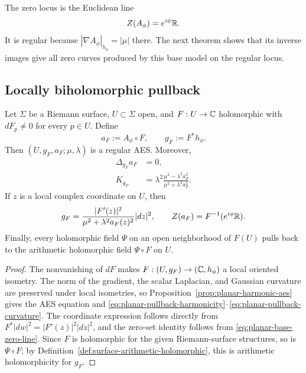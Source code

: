 The zero locus is the Euclidean line
\begin{equation}\label{eq:planar-base-zero-line}
 Z(A_\phi)=e^{i\phi}\mathbb{R}.
\end{equation}
It is regular because \(|\nabla A_\phi|_{h_\phi}=|\mu|\) there.  The next theorem
shows that its inverse images give all zero curves produced by this base model on
the regular locus.

\subsection{Locally biholomorphic pullback}

\begin{theorem}
\label{thm:planar-holomorphic-pullback}
Let \(\Sigma\) be a Riemann surface, \(U\subset\Sigma\) open, and
\(F:U\to\mathbb{C}\) holomorphic with \(dF_p\ne0\) for every \(p\in U\).  Define
\begin{equation}\label{eq:planar-pullback-data}
 a_F:=A_\phi\circ F,
 \qquad
 g_F:=F^*h_\phi.
\end{equation}
Then \((U,g_F,a_F;\mu,\lambda)\) is a regular AES.  Moreover,
\begin{align}
 \Delta_{g_F}a_F&=0,
 \label{eq:planar-pullback-harmonicity}\\
 K_{g_F}
 &=\lambda^2
   \frac{\mu^2-\lambda^2a_F^2}
        {\mu^2+\lambda^2a_F^2}.
 \label{eq:planar-pullback-curvature}
\end{align}
If \(z\) is a local complex coordinate on \(U\), then
\begin{equation}\label{eq:planar-pullback-local-form}
 g_F=
 \frac{|F'(z)|^2}{\mu^2+\lambda^2a_F(z)^2}|dz|^2,
 \qquad
 Z(a_F)=F^{-1}(e^{i\phi}\mathbb{R}).
\end{equation}
Finally, every holomorphic field \(\Psi\) on an open neighborhood of \(F(U)\)
pulls back to the arithmetic holomorphic field \(\Psi\circ F\) on \(U\).
\end{theorem}

\begin{proof}
The nonvanishing of \(dF\) makes \(F:(U,g_F)\to(\mathbb{C},h_\phi)\) a local oriented
isometry.  The norm of the gradient, the scalar Laplacian, and Gaussian curvature
are preserved under local isometries, so
Proposition~\ref{prop:planar-harmonic-aes} gives the AES equation and
\eqref{eq:planar-pullback-harmonicity}--\eqref{eq:planar-pullback-curvature}.
The coordinate expression follows directly from
\(F^*|dw|^2=|F'(z)|^2|dz|^2\), and the zero-set identity follows from
\eqref{eq:planar-base-zero-line}.  Since \(F\) is holomorphic for the given
Riemann-surface structures, so is \(\Psi\circ F\); by
Definition~\ref{def:surface-arithmetic-holomorphic}, this is arithmetic
holomorphicity for \(g_F\).
\end{proof}


